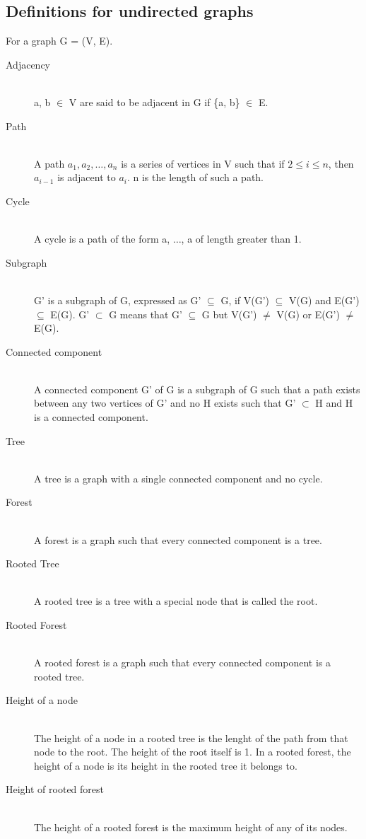 \subsection{Definitions for undirected graphs}
For a graph G = (V, E).
\begin{description}
 \item[Adjacency] \hfill \\
  a, b $\in$ V are said to be adjacent in G if \{a, b\} $\in$ E.
 \item[Path] \hfill \\
  A path $a_1, a_2, \ldots, a_n$ is a series of vertices in V such that if $2 \leq i \leq n$, then $a_{i-1}$ is adjacent to $a_i$. n is the length of such a path.
 \item[Cycle] \hfill \\
  A cycle is a path of the form a, $\ldots$, a of length greater than 1.
 \item[Subgraph] \hfill \\
 G' is a subgraph of G, expressed as G' $\subseteq$ G, if V(G') $\subseteq$ V(G) and E(G') $\subseteq$ E(G). G' $\subset$ G means that G' $\subseteq$ G but V(G') $\neq$ V(G) or E(G') $\neq$ E(G).
 \item[Connected component] \hfill \\
  A connected component G' of G is a subgraph of G such that a path exists between any two vertices of G' and no H exists such that G' $\subset$ H and H is a connected component.
  \item[Tree] \hfill \\ 
  A tree is a graph with a single connected component and no cycle.
  \item[Forest] \hfill \\
  A forest is a graph such that every connected component is a tree.
  \item[Rooted Tree] \hfill \\ 
  A rooted tree is a tree with a special node that is called the root.
  \item[Rooted Forest] \hfill \\ 
  A rooted forest is a graph such that every connected component is a rooted tree.
  \item[Height of a node] \hfill \\ 
  The height of a node in a rooted tree is the lenght of the path from that node to the root. The height of the root itself is 1. In a rooted forest, the height of a node is its height in the rooted tree it belongs to.
  \item[Height of rooted forest] \hfill \\ 
  The height of a rooted forest is the maximum height of any of its nodes.
\end{description}


